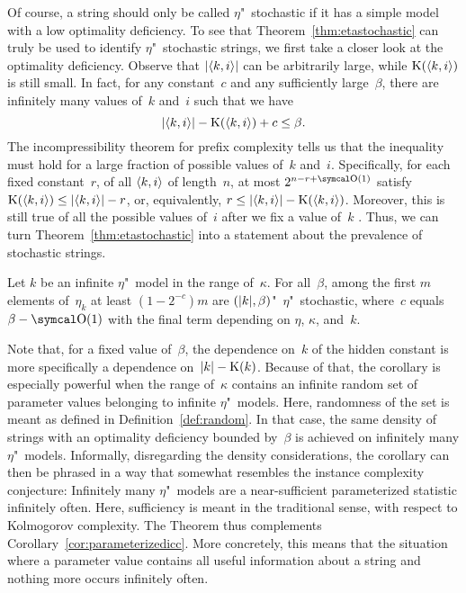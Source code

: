 Of course, a string should only be called $\eta$"~stochastic if it has a simple model with a low optimality deficiency.
To see that Theorem~\ref{thm:etastochastic} can truly be used to identify $\eta$"~stochastic strings, we first take a closer look at the optimality deficiency.
Observe that ${\lvert{\langle k, i\rangle}\rvert}$ can be arbitrarily large, while $\operatorname{K}({\langle k, i\rangle})$ is still small.
In fact, for any constant~$c$ and any sufficiently large~$\beta$, there are infinitely many values of~$k$ and~$i$ such that we have
\begin{equation*}
  {\lvert{\langle k, i\rangle}\rvert} - \operatorname{K}({\langle k, i\rangle}) + c \le \beta.
\end{equation*}
The incompressibility theorem for prefix complexity \parencite[Theorem~3.3.1(ii)]{li2008introduction} tells us that the inequality must hold for a large fraction of possible values of~$k$ and~$i$.
Specifically, for each fixed constant~$r$, of all ${\langle k, i\rangle}$ of length~$n$, at most $2^{n - r + \bigO(1)}$ satisfy $\operatorname{K}({\langle k, i\rangle}) \le {\lvert{\langle k, i\rangle}\rvert} - r$, or, equivalently, $r \le {\lvert{\langle k, i\rangle}\rvert} - \operatorname{K}({\langle k, i\rangle})$.
Moreover, this is still true of all the possible values of~$i$ after we fix a value of~$k$ \parencite[Theorem~3.9.1]{li2008introduction}.
Thus, we can turn Theorem~\ref{thm:etastochastic} into a statement about the prevalence of stochastic strings.
\begin{corollary}
\label{cor:stochastic}%
  Let $k$ be an infinite $\eta$"~model in the range of~$\kappa$.
  For all~$\beta$, among the first $m$ elements of~$\eta_k$ at least $(1 - 2^{-c})m$ are $({\lvert k\rvert}, \beta)$"~$\eta$"~stochastic, where~$c$ equals $\beta - \bigO(1)$ with the final term depending on $\eta$, $\kappa$, and~$k$.
\end{corollary}
Note that, for a fixed value of~$\beta$, the dependence on~$k$ of the hidden constant is more specifically a dependence on~${\lvert k\rvert} - \operatorname{K}(k)$.
Because of that, the corollary is especially powerful when the range of~$\kappa$ contains an infinite random set of parameter values belonging to infinite $\eta$"~models.
Here, randomness of the set is meant as defined in Definition~\ref{def:random}.
In that case, the same density of strings with an optimality deficiency bounded by~$\beta$ is achieved on infinitely many $\eta$"~models.
Informally, disregarding the density considerations, the corollary can then be phrased in a way that somewhat resembles the instance complexity conjecture:
Infinitely many $\eta$"~models are a near-sufficient parameterized statistic infinitely often.
Here, sufficiency is meant in the traditional sense, with respect to Kolmogorov complexity.
The Theorem thus complements Corollary~\ref{cor:parameterizedicc}.
More concretely, this means that the situation where a parameter value contains all useful information about a string and nothing more occurs infinitely often.

